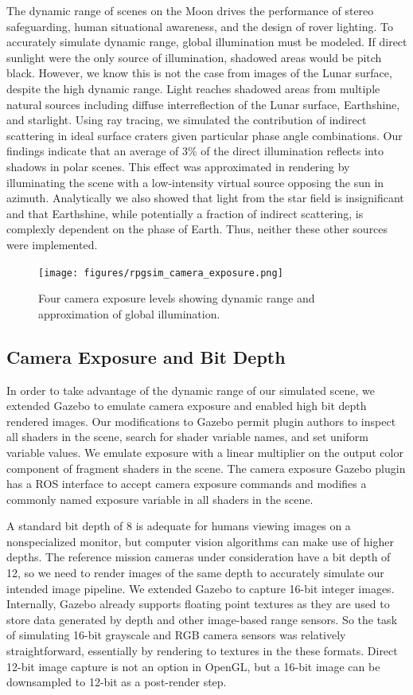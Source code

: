 \documentclass[twocolumn,letterpaper]{IEEEAerospaceCLS}  %
\begin{document}
The dynamic range of scenes on the Moon drives the performance of stereo safeguarding, human situational awareness, and the design of rover lighting.  
To accurately simulate dynamic range, global illumination must be modeled.  
If direct sunlight were the only source of illumination, shadowed areas would be pitch black.  
However, we know this is not the case from images of the Lunar surface, despite the high dynamic range.  
Light reaches shadowed areas from multiple natural sources including diffuse interreflection of the Lunar surface, Earthshine, and starlight.  
Using ray tracing, we simulated the contribution of indirect scattering in ideal surface craters given particular phase angle combinations.  
Our findings indicate that an average of 3\% of the direct illumination reflects into shadows in polar scenes.  
This effect was approximated in rendering by illuminating the scene with a low-intensity virtual source opposing the sun in azimuth.  
Analytically we also showed that light from the star field is insignificant and that Earthshine, while potentially a fraction of indirect scattering, is complexly dependent on the phase of Earth.  
Thus, neither these other sources were implemented. 

\begin{figure}[h!]
  \texttt{[image: figures/rpgsim\_camera\_exposure.png]}
  \caption{Four camera exposure levels showing dynamic range and approximation of global illumination.  }
  \label{fig:cameraexposure}
\end{figure}

\subsection{Camera Exposure and Bit Depth}
In order to take advantage of the dynamic range of our simulated scene, we extended Gazebo to emulate camera exposure and enabled high bit depth rendered images.  
Our modifications to Gazebo permit plugin authors to inspect all shaders in the scene, search for shader variable names, and set uniform variable values.  
We emulate exposure with a linear multiplier on the output color component of fragment shaders in the scene.  
The camera exposure Gazebo plugin has a ROS interface to accept camera exposure commands and modifies a commonly named exposure  variable in all shaders in the scene.  

A standard bit depth of 8 is adequate for humans viewing images on a nonspecialized monitor, but computer vision algorithms can make use of higher depths.  
The reference mission cameras under consideration have a bit depth of 12, so we need to render images of the same depth to accurately simulate our intended image pipeline.  
We extended Gazebo to capture 16-bit integer images.  
Internally, Gazebo already supports floating point textures as they are used to store data generated by depth and other image-based range sensors.  So the task of simulating 16-bit grayscale and RGB camera sensors was relatively straightforward, essentially by rendering to textures in the these formats.  
Direct 12-bit image capture is not an option in OpenGL, but a 16-bit image can be downsampled to 12-bit as a post-render step.
\end{document}
